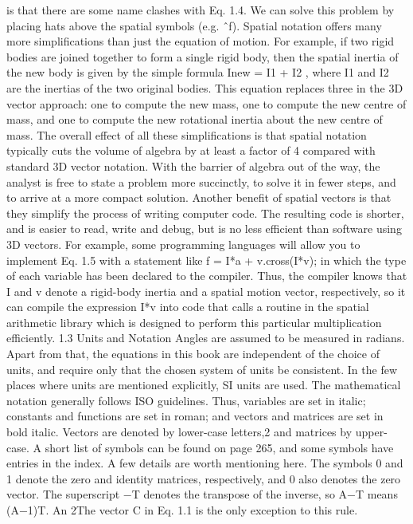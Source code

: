 is that there are some name clashes with Eq. 1.4. We can solve this problem by placing hats above the spatial symbols (e.g. ˆf). Spatial notation offers many more simplifications than just the equation of motion. For example, if two rigid bodies are joined together to form a single rigid body, then the spatial inertia of the new body is given by the simple formula Inew = I1 + I2 , where I1 and I2 are the inertias of the two original bodies. This equation replaces three in the 3D vector approach: one to compute the new mass, one to compute the new centre of mass, and one to compute the new rotational inertia about the new centre of mass. The overall effect of all these simplifications is that spatial notation typically cuts the volume of algebra by at least a factor of 4 compared with standard 3D vector notation. With the barrier of algebra out of the way, the analyst is free to state a problem more succinctly, to solve it in fewer steps, and to arrive at a more compact solution. Another benefit of spatial vectors is that they simplify the process of writing computer code. The resulting code is shorter, and is easier to read, write and debug, but is no less efficient than software using 3D vectors. For example, some programming languages will allow you to implement Eq. 1.5 with a statement like f = I*a + v.cross(I*v); in which the type of each variable has been declared to the compiler. Thus, the compiler knows that I and v denote a rigid-body inertia and a spatial motion vector, respectively, so it can compile the expression I*v into code that calls a routine in the spatial arithmetic library which is designed to perform this particular multiplication efficiently. 1.3 Units and Notation Angles are assumed to be measured in radians. Apart from that, the equations in this book are independent of the choice of units, and require only that the chosen system of units be consistent. In the few places where units are mentioned explicitly, SI units are used. The mathematical notation generally follows ISO guidelines. Thus, variables are set in italic; constants and functions are set in roman; and vectors and matrices are set in bold italic. Vectors are denoted by lower-case letters,2 and matrices by upper-case. A short list of symbols can be found on page 265, and some symbols have entries in the index. A few details are worth mentioning here. The symbols 0 and 1 denote the zero and identity matrices, respectively, and 0 also denotes the zero vector. The superscript −T denotes the transpose of the inverse, so A−T means (A−1)T. An 2The vector C in Eq. 1.1 is the only exception to this rule.

